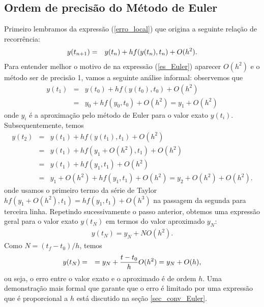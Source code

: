 \subsection{Ordem de precisão do Método de Euler}{\label{sec_pre_euler}}
Primeiro lembramos da expressão (\ref{erro_local}) que origina a seguinte relação de recorrência:
\begin{eqnarray}{\label{es_Euler}}
y(t_{n+1})&=&y(t_n)+hf(y(t_n),t_n)+O(h^2).
\end{eqnarray}
Para entender melhor o motivo de na expressão (\ref{es_Euler}) aparecer $O(h^2)$ e o método ser de precisão 1, vamos a seguinte análise informal: observemos que
\begin{eqnarray*}
 y(t_1)&=&y(t_0)+hf(y(t_0),t_0)+O(h^2)\\
 &=&y_0+hf(y_0,t_0)+O(h^2)=y_1+O(h^2)
\end{eqnarray*}
onde $y_i$ é a aproximação pelo método de Euler para o valor exato $y(t_i)$. Subsequentemente, temos
\begin{eqnarray*}
 y(t_2)&=&y(t_1)+hf(y(t_1),t_1)+O(h^2)\\
 &=&y(t_1)+hf(y_1+O(h^2),t_1)+O(h^2)\\
 &=&y(t_1)+hf(y_1,t_1) +O(h^2)\\
 &=&y_1+O(h^2)+hf(y_1,t_1) +O(h^2)= y_2+O(h^2)+O(h^2).
\end{eqnarray*}
onde usamos o primeiro termo da série de Taylor $hf(y_1+O(h^2),t_1)=hf(y_1,t_1)+O(h^3)$ na passagem da segunda para terceira linha. Repetindo sucessivamente o passo anterior, obtemos uma expressão geral para o valor exato $y(t_N)$ em termos do valor aproximado $y_N$:
\begin{eqnarray*}
 y(t_N)=y_N+N O(h^2) .
\end{eqnarray*}
Como $N=(t_f-t_0)/h$, temos
\begin{eqnarray}{\label{euler_precisao}}
 y(t_N)&=&=y_{N}+\frac{t-t_0}{h}O(h^2)=y_{N}+O(h),
\end{eqnarray}
ou seja, o erro entre o valor exato e o aproximado é de ordem $h$. Uma demonstração mais formal que garante que o erro é limitado por uma expressão que é proporcional a $h$ está discutido na seção \ref{sec_conv_Euler}.

